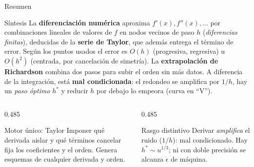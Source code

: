\documentclass[aspectratio=169,10pt]{beamer}
\begin{document}
\begin{frame}{Resumen}
\begin{cardidea}{Síntesis}{\faLightbulb}
La \textbf{diferenciación numérica} aproxima $f'(x),f''(x),\dots$ por combinaciones lineales de valores de $f$ en nodos vecinos de paso $h$ (\emph{diferencias finitas}), deducidas de la \textbf{serie de Taylor}, que además entrega el término de error. Según los puntos usados el error es $O(h)$ (progresiva, regresiva) u $O(h^2)$ (centrada, por cancelación de simetría). La \textbf{extrapolación de Richardson} combina dos pasos para subir el orden sin más datos. A diferencia de la integración, está \textbf{mal condicionada}: el redondeo se amplifica por $1/h$, hay un \emph{paso óptimo} $h^*$ y reducir $h$ por debajo lo empeora (curva en ``V'').
\end{cardidea}
\vspace{2mm}
\begin{columns}[T]
\begin{column}{0.485\textwidth}
\begin{cardgear}{Motor único: Taylor}{\faCogs}
Imponer qué derivada aislar y qué términos cancelar fija los coeficientes y el orden. Genera esquemas de cualquier derivada y orden.
\end{cardgear}
\end{column}
\begin{column}{0.485\textwidth}
\begin{cardgear}{Rasgo distintivo}{\faCogs}
Derivar \emph{amplifica} el ruido ($1/h$): mal condicionado. Hay $h^*\!\sim u^{1/3}$; ni con doble precisión se alcanza $\epsilon$ de máquina.
\end{cardgear}
\end{column}
\end{columns}
\end{frame}
\end{document}
